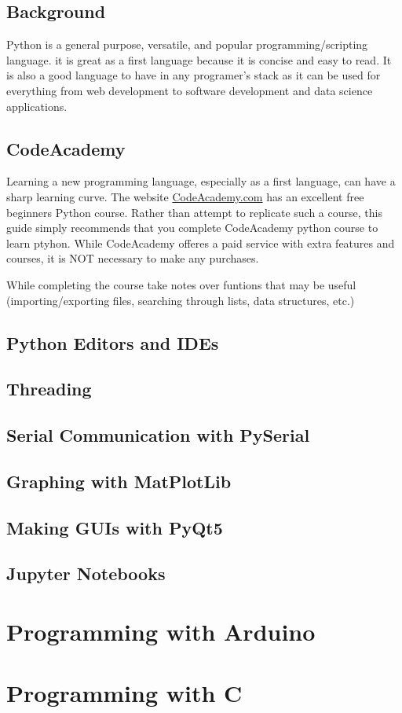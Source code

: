    	\subsection{Background}
   		Python is a general purpose, versatile, and popular programming/scripting language. it is great as a first language because it is concise and easy to read. It is also a good language to have in any programer's stack as it can be used for everything from web development to software development and data science applications.
   	\subsection{CodeAcademy}
   		Learning a new programming language, especially as a first language, can have a sharp learning curve. The website \href{https://www.codecademy.com/}{CodeAcademy.com} has an excellent free beginners Python course. Rather than attempt to replicate such a course, this guide simply recommends that you complete CodeAcademy python course to learn ptyhon. While CodeAcademy offeres a paid service with extra features and courses, it is NOT necessary to make any purchases.

   		While completing the course take notes over funtions that may be useful (importing/exporting files, searching through lists, data structures, etc.)
   	\subsection{Python Editors and IDEs}
   	\subsection{Threading}
   	\subsection{Serial Communication with PySerial}
   	\subsection{Graphing with MatPlotLib}
   	\subsection{Making GUIs with PyQt5}
   	\subsection{Jupyter Notebooks}

\section{Programming with Arduino}

\section{Programming with C}

